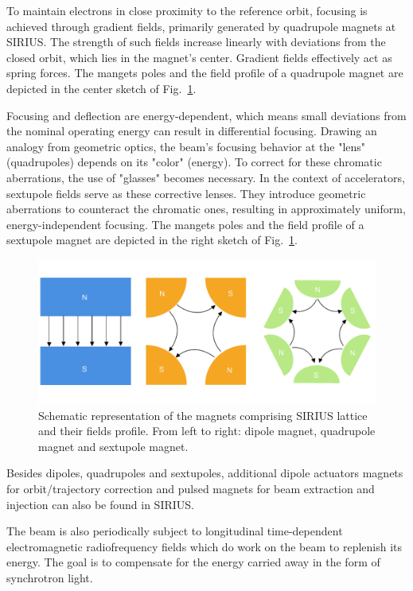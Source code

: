To maintain electrons in close proximity to the reference orbit, focusing is achieved through gradient fields, primarily generated by quadrupole magnets at SIRIUS. The strength of such fields increase linearly with deviations from the closed orbit, which lies in the magnet's center. Gradient fields effectively act as spring forces. The mangets poles and the field profile of a quadrupole magnet are depicted in the center sketch of Fig.~\ref{fig:magnets_fields}.

Focusing and deflection are energy-dependent, which means small deviations from the nominal operating energy can result in differential focusing. Drawing an analogy from geometric optics, the beam's focusing behavior at the "lens" (quadrupoles) depends on its "color" (energy). To correct for these chromatic aberrations, the use of "glasses" becomes necessary. In the context of accelerators, sextupole fields serve as these corrective lenses. They introduce geometric aberrations to counteract the chromatic ones, resulting in approximately uniform, energy-independent focusing. The mangets poles and the field profile of a sextupole magnet are depicted in the right sketch of Fig.~\ref{fig:magnets_fields}.
\begin{figure}[htb]
    \includegraphics[width=\textwidth]{Images/magnets.pdf}
    \caption{Schematic representation of the magnets comprising SIRIUS lattice and their fields profile. From left to right: dipole magnet, quadrupole magnet and sextupole magnet.}
    \label{fig:magnets_fields}
\end{figure}

Besides dipoles, quadrupoles and sextupoles, additional dipole actuators magnets for orbit/trajectory correction and pulsed magnets for beam extraction and injection can also be found in SIRIUS.

The beam is also periodically subject to longitudinal time-dependent electromagnetic radiofrequency fields which do work on the beam to replenish its energy. The goal is to compensate for the energy carried away in the form of synchrotron light.

